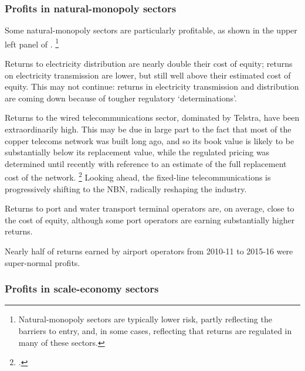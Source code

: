 \subsubsection{Profits in natural-monopoly sectors}

Some natural-monopoly sectors are particularly profitable, as shown in the upper left panel of .%
    \footnote{Natural-monopoly sectors are typically lower risk, partly reflecting the barriers to entry, and, in some cases, reflecting that returns are regulated in many of these sectors.}

Returns to electricity distribution are nearly double their cost of equity; returns on electricity transmission are lower, but still well above their estimated cost of equity. This may not continue: returns in electricity transmission and distribution are coming down because of tougher regulatory `determinations'.

Returns to the wired telecommunications sector, dominated by Telstra, have been extraordinarily high. This may be due in large part to the fact that most of the copper telecoms network was built long ago, and so its book value is likely to be substantially below its replacement value, while the regulated pricing was determined until recently with reference to an estimate of the full replacement cost of the network.%
    \footcite{ACCC2016TelecommunicationsReports}
Looking ahead, the fixed-line telecommunications is progressively shifting to the NBN, radically reshaping the industry. 

Returns to port and water transport terminal operators are, on average, close to the cost of equity, although some port operators are earning substantially higher returns.

Nearly half of returns earned by airport operators from 2010-11 to 2015-16 were super-normal profits.


\newpage

\subsubsection{Profits in scale-economy sectors}

